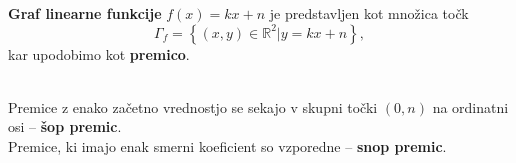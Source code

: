     \noindent
\begin{minipage}[c]{0.67\linewidth}

                \textbf{Graf linearne funkcije} $f(x)=kx+n$ je predstavljen kot množica točk 
                $$\Gamma_f=\left\{(x,y)\in\mathbb{R}^2 | y=kx+n\right\}, $$
                kar upodobimo kot \textbf{premico}.

                ~\\
                Premice z enako začetno vrednostjo se sekajo v skupni točki $(0,n)$ na ordinatni osi -- \textbf{šop premic}.
                ~\\
                Premice, ki imajo enak smerni koeficient so vzporedne -- \textbf{snop premic}.


        \end{minipage}
